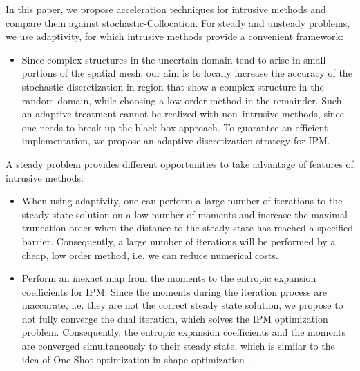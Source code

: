 In this paper, we propose acceleration techniques for intrusive methods and compare them against stochastic-Collocation. For steady and unsteady problems, we use adaptivity, for which intrusive methods provide a convenient framework: %
\begin{itemize}
\item Since complex structures in the uncertain domain tend to arise in small portions of the spatial mesh, our aim is to locally increase the accuracy of the stochastic discretization in region that show a complex structure in the random domain, while choosing a low order method in the remainder. Such an adaptive treatment cannot be realized with non--intrusive methods, since one needs to break up the black-box approach. To guarantee an efficient implementation, we propose an adaptive discretization strategy for IPM.
\end{itemize}
A steady problem provides different opportunities to take advantage of features of intrusive methods: 
\begin{itemize}
\item When using adaptivity, one can perform a large number of iterations to the steady state solution on a low number of moments and increase the maximal truncation order when the distance to the steady state has reached a specified barrier. Consequently, a large number of iterations will be performed by a cheap, low order method, i.e. we can reduce numerical costs. 
\item Perform an inexact map from the moments to the entropic expansion coefficients for IPM: Since the moments during the iteration process are inaccurate, i.e. they are not the correct steady state solution, we propose to not fully converge the dual iteration, which solves the IPM optimization problem. Consequently, the entropic expansion coefficients and the moments are converged simultaneously to their steady state, which is similar to the idea of One-Shot optimization in shape optimization \cite{hazra2005aerodynamic}.
\end{itemize}

